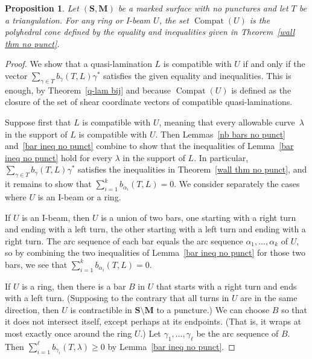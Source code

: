 \documentclass{amsart}
\newtheorem{prop}[proposition]{Proposition}
\theoremstyle{definition}
\theoremstyle{remark}
\numberwithin{equation}{section}
\newcommand{\0}{{\mathbf{0}}}
\newcommand{\M}{\mathbf{M}}
\renewcommand{\S}{\mathbf{S}}
\newcommand{\Compat}{\operatorname{Compat}}
\begin{document}
\begin{prop}\label{all but codim no punct}
Let $(\S,\M)$ be a marked surface \emph{with no punctures} and let $T$ be a triangulation.
For any ring or I-beam $U$, the set $\Compat(U)$ is the polyhedral cone defined by the equality and inequalities given in Theorem~\ref{wall thm no punct}.
\end{prop}
\begin{proof}
We show that a quasi-lamination $L$ is compatible with $U$ if and only if the vector $\sum_{\gamma\in T}b_\gamma(T,L)\gamma^*$ satisfies the given equality and inequalities.
This is enough, by Theorem~\ref{q-lam bij} and because $\Compat(U)$ is defined as the closure of the set of shear coordinate vectors of compatible quasi-laminations.

Suppose first that $L$ is compatible with $U$, meaning that every allowable curve~$\lambda$ in the support of $L$ is compatible with $U$.
Then Lemmas~\ref{nb bars no punct} and~\ref{bar ineq no punct} combine to show that the inequalities of Lemma~\ref{bar ineq no punct} hold for every $\lambda$ in the support of $L$.
In particular, $\sum_{\gamma\in T}b_\gamma(T,L)\gamma^*$ satisfies the inequalities in Theorem~\ref{wall thm no punct}, and it remains to show that $\sum_{i=1}^kb_{\alpha_i}(T,L)=0$.
We consider separately the cases where $U$ is an I-beam or a ring.

If $U$ is an I-beam, then $U$ is a union of two bars, one starting with a right turn and ending with a left turn, the other starting with a left turn and ending with a right turn.
The arc sequence of each bar equals the arc sequence $\alpha_1,\ldots,\alpha_k$ of $U$, so by combining the two inequalities of Lemma~\ref{bar ineq no punct} for those two bars, we see that $\sum_{i=1}^kb_{\alpha_i}(T,L)=0$.

If $U$ is a ring, then there is a bar $B$ in $U$ that starts with a right turn and ends with a left turn.
(Supposing to the contrary that all turns in $U$ are in the same direction, then $U$ is contractible in $\S\setminus\M$ to a puncture.)
We can choose $B$ so that it does not intersect itself, except perhaps at its endpoints.
(That is, it wraps at most exactly once around the ring $U$.)
Let $\gamma_1,\ldots,\gamma_\ell$ be the arc sequence of $B$.
Then $\sum_{i=1}^\ell b_{\gamma_i}(T,\lambda)\geq 0$ by Lemma~\ref{bar ineq no punct}.


\end{proof}
\end{document}
